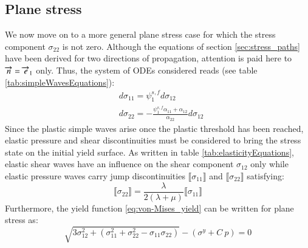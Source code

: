 \subsection{Plane stress}
\label{sec:num_plane_stress}
We now move on to a more general plane stress case for which the stress component $\sigma_{22} $ is not zero.
Although the equations of section \ref{sec:stress_paths} have been derived for two directions of propagation, attention is paid here to ${\overrightarrow{n}}={\overrightarrow{e}}_1$ only. 
Thus, the system of ODEs considered reads (see table \ref{tab:simpleWavesEquations}):
\begin{equation}
  \label{eq:plane_stress_paths}
  \begin{aligned}
    & d\sigma_{11} = \psi_1^{s,f} d\sigma_{12} \\
    & d\sigma_{22}= -\frac{\psi^{s,f}_{1}\alpha_{11}+\alpha_{12}}{\alpha_{22}}d\sigma_{12}
  \end{aligned}
\end{equation}
Since the plastic simple waves arise once the plastic threshold has been reached, elastic pressure and shear discontinuities must be considered to bring the stress state on the initial yield surface.
As written in table \ref{tab:elasticityEquations}, elastic shear waves have an influence on the shear component $\sigma_{12}$ only while elastic pressure waves carry jump discontinuities $\llbracket  \sigma_{11} \rrbracket$ and $\llbracket \sigma_{22} \rrbracket$ satisfying:
\begin{equation}
  \label{eq:CP_stress_relation}
  \llbracket  \sigma_{22} \rrbracket = \frac{\lambda}{2(\lambda+\mu)} \llbracket \sigma_{11} \rrbracket
\end{equation}
Furthermore, the yield function \eqref{eq:von-Mises_yield} can be written for plane stress as:
\begin{equation}
  \label{eq:yield_plane_stress}
  \sqrt{3\sigma_{12}^2 + (\sigma_{11}^2 + \sigma_{22}^2 - \sigma_{11}\sigma_{22})} -(\sigma^y + C\: p) = 0
\end{equation}

